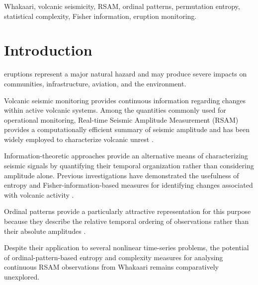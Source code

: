\documentclass[journal]{IEEEtran}
\begin{document}
	
	\begin{IEEEkeywords}
		Whakaari, volcanic seismicity, RSAM, ordinal patterns,
		permutation entropy, statistical complexity,
		Fisher information, eruption monitoring.
	\end{IEEEkeywords}
	
	
	\section{Introduction}
	
	 eruptions represent a major natural
	hazard and may produce severe impacts on communities,
	infrastructure, aviation, and the environment.
	
	
	Volcanic seismic monitoring provides continuous information
	regarding changes within active volcanic systems. Among the
	quantities commonly used for operational monitoring, Real-time
	Seismic Amplitude Measurement (RSAM) provides a computationally
	efficient summary of seismic amplitude and has been widely
	employed to characterize volcanic unrest \cite{Endo1991}.
	
	Information-theoretic approaches provide an alternative means of
	characterizing seismic signals by quantifying their temporal
	organization rather than considering amplitude alone.
	Previous investigations have demonstrated the usefulness of
	entropy and Fisher-information-based measures for identifying
	changes associated with volcanic activity
	\cite{Telesca2014,ReyDevesa2023}.
	
	Ordinal patterns provide a particularly attractive representation
	for this purpose because they describe the relative temporal
	ordering of observations rather than their absolute amplitudes
	\cite{Bandt2002}.
	
	Despite their application to several nonlinear time-series
	problems, the potential of ordinal-pattern-based entropy and
	complexity measures for analysing continuous RSAM observations
	from Whakaari remains comparatively unexplored.
	
\end{document}
